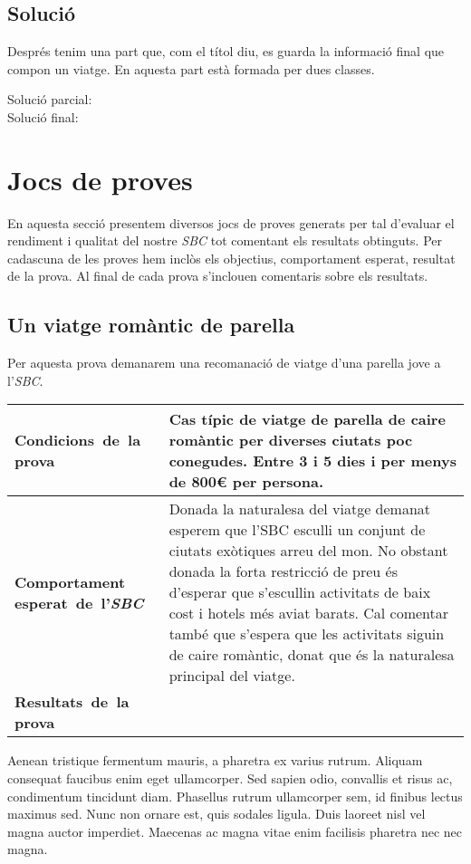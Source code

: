 \documentclass[11pt,a4paper]{article}
\begin{document}
\subsection{Solució} 
Després tenim una part que, com el títol diu, es guarda la informació final que compon un viatge. En aquesta part està formada per dues classes.

\begin{description}
\item[Solució parcial:]
\item[Solució final:]

\end{description}

\clearpage

\section{Jocs de proves}
En aquesta secció presentem diversos jocs de proves generats per tal d'evaluar el rendiment i qualitat del nostre \emph{SBC} tot comentant els resultats obtinguts. Per cadascuna de les proves hem inclòs els objectius, comportament esperat, resultat de la prova. Al final de cada prova s'inclouen comentaris sobre els resultats.

\subsection{Un viatge romàntic de parella}
Per aquesta prova demanarem una recomanació de viatge d'una parella jove a l'\emph{SBC}.\\

\noindent
\begin{tabular}{|p{}|p{}|}
\hline
\textbf{\mbox{Condicions de la} \mbox{prova}} & Cas típic de viatge de parella de caire romàntic per diverses ciutats poc conegudes. Entre 3 i 5 dies i per menys de 800\euro{} per persona.\\
\hline
\textbf{Comportament \mbox{esperat de l'\emph{SBC}}} & Donada la naturalesa del viatge demanat esperem que l'SBC esculli un conjunt de ciutats exòtiques arreu del mon. No obstant donada la forta restricció de preu és d'esperar que s'escullin activitats de baix cost i hotels més aviat barats. Cal comentar també que s'espera que les activitats siguin de caire romàntic, donat que és la naturalesa principal del viatge. \\
\hline
\textbf{\mbox{Resultats de la} \mbox{prova}} & \\
\hline
\end{tabular}

Aenean tristique fermentum mauris, a pharetra ex varius rutrum. Aliquam consequat faucibus enim eget ullamcorper. Sed sapien odio, convallis et risus ac, condimentum tincidunt diam. Phasellus rutrum ullamcorper sem, id finibus lectus maximus sed. Nunc non ornare est, quis sodales ligula. Duis laoreet nisl vel magna auctor imperdiet. Maecenas ac magna vitae enim facilisis pharetra nec nec magna.
\end{document}
